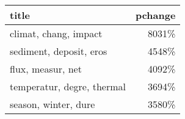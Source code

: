 \begin{tabular}{p{1.2cm}r}
\toprule
                      title &  pchange \\
\midrule
      climat, chang, impact &    8031\% \\
    sediment, deposit, eros &    4548\% \\
          flux, measur, net &    4092\% \\
 temperatur, degre, thermal &    3694\% \\
       season, winter, dure &    3580\% \\
\bottomrule
\end{tabular}
